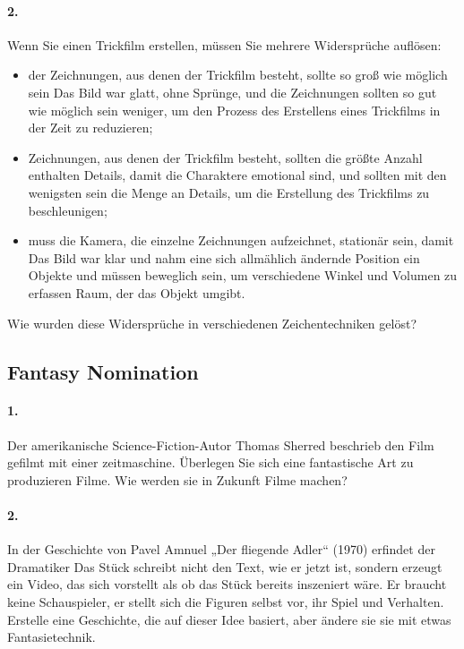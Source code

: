 \documentclass[11pt,a4paper]{article}
\begin{document}
\paragraph{2.}
Wenn Sie einen Trickfilm erstellen, müssen Sie mehrere Widersprüche auflösen:
\begin{itemize}
\item der Zeichnungen, aus denen der Trickfilm besteht, sollte so groß wie
  möglich sein Das Bild war glatt, ohne Sprünge, und die Zeichnungen sollten
  so gut wie möglich sein weniger, um den Prozess des Erstellens eines
  Trickfilms in der Zeit zu reduzieren;
\item Zeichnungen, aus denen der Trickfilm besteht, sollten die größte Anzahl
  enthalten Details, damit die Charaktere emotional sind, und sollten mit den
  wenigsten sein die Menge an Details, um die Erstellung des Trickfilms zu
  beschleunigen;
\item muss die Kamera, die einzelne Zeichnungen aufzeichnet, stationär sein,
  damit Das Bild war klar und nahm eine sich allmählich ändernde Position ein
  Objekte und müssen beweglich sein, um verschiedene Winkel und Volumen zu
  erfassen Raum, der das Objekt umgibt.
\end{itemize}
Wie wurden diese Widersprüche in verschiedenen Zeichentechniken gelöst?

\subsection*{Fantasy Nomination}

\paragraph{1.}
Der amerikanische Science-Fiction-Autor Thomas Sherred beschrieb den Film
gefilmt mit einer zeitmaschine. Überlegen Sie sich eine fantastische Art zu
produzieren Filme. Wie werden sie in Zukunft Filme machen?

\paragraph{2.}
In der Geschichte von Pavel Amnuel „Der fliegende Adler“ (1970) erfindet der
Dramatiker Das Stück schreibt nicht den Text, wie er jetzt ist, sondern
erzeugt ein Video, das sich vorstellt als ob das Stück bereits inszeniert
wäre. Er braucht keine Schauspieler, er stellt sich die Figuren selbst vor,
ihr Spiel und Verhalten. Erstelle eine Geschichte, die auf dieser Idee
basiert, aber ändere sie sie mit etwas Fantasietechnik.
\end{document}
